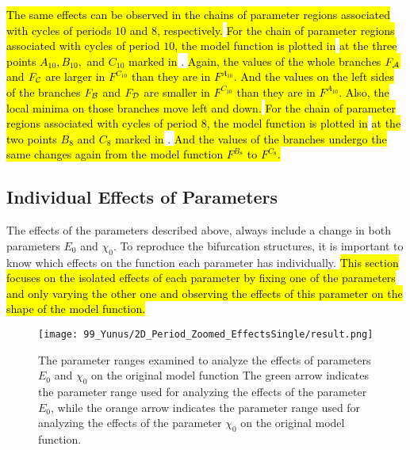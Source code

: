\hl{
	The same effects can be observed in the chains of parameter regions associated with cycles of periods $10$ and $8$, respectively.
}
\hl{For the chain of parameter regions associated with cycles of period $10$, the model function is plotted in}  \hl{at the three points $A_{10}, B_{10},$ and $C_{10}$ marked in} .
\hl{
	Again, the values of the whole branches $F_{\mathcal{A}}$ and $F_{\mathcal{C}}$ are larger in $F^{C_{10}}$ than they are in $F^{A_{10}}$.
	And the values on the left sides of the branches $F_{\mathcal{B}}$ and $F_{\mathcal{D}}$ are smaller in $F^{C_{10}}$ than they are in $F^{A_{10}}$.
	Also, the local minima on those branches move left and down.
}
\hl{For the chain of parameter regions associated with cycles of period $8$, the model function is plotted in}  \hl{at the two points $B_8$ and $C_8$ marked in} .
\hl{
	And the values of the branches undergo the same changes again from the model function $F^{B_8}$ to $F^{C_8}$.
}

\subsection{Individual Effects of Parameters}
\label{sec:setup.char.paramfx.individual}

The effects of the parameters described above, always include a change in both parameters $E_0$ and $\chi_0$.
To reproduce the bifurcation structures, it is important to know which effects on the function each parameter has individually.
\hl{
	This section focuses on the isolated effects of each parameter by fixing one of the parameters and only varying the other one and observing the effects of this parameter on the shape of the model function.
}

\begin{figure}
	\centering
	\texttt{[image: 99\_Yunus/2D\_Period\_Zoomed\_EffectsSingle/result.png]}
	\caption[The parameter ranges examined to analyze the effects of parameters on the original model function]{
		The parameter ranges examined to analyze the effects of parameters $E_0$ and $\chi_0$ on the original model function
		The green arrow indicates the parameter range used for analyzing the effects of the parameter $E_0$, while the orange arrow indicates the parameter range used for analyzing the effects of the parameter $\chi_0$ on the original model function.
	}
	\label{fig:setup.char.evolution.single.map}
\end{figure}

